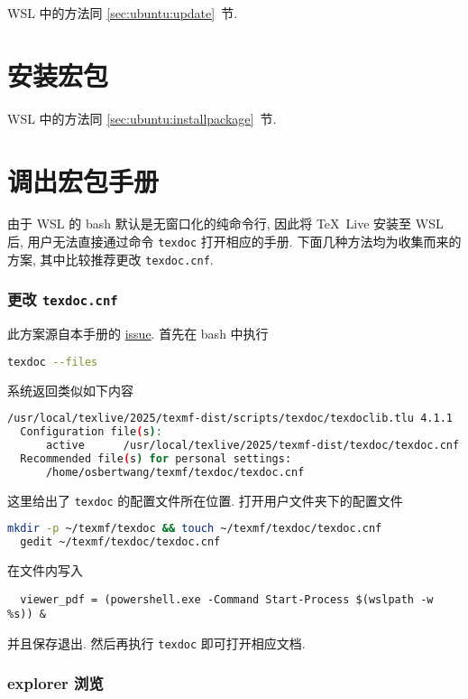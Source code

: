 WSL 中的方法同 \ref{sec:ubuntu:update}~节.

\section{安装宏包}

WSL 中的方法同 \ref{sec:ubuntu:installpackage}~节.

\section{调出宏包手册}

由于 WSL 的 \textsf{bash} 默认是无窗口化的纯命令行,
因此将 \TeX\ Live 安装至 WSL 后,
用户无法直接通过命令 \texttt{texdoc} 打开相应的手册.
下面几种方法均为收集而来的方案,
其中比较推荐更改 \texttt{texdoc.cnf}.

\subsubsection{更改 \texttt{texdoc.cnf}}

此方案源自本手册的 \href{https://github.com/OsbertWang/install-latex-guide-zh-cn/issues/13}{issue}.
首先在 \textsf{bash} 中执行
\begin{lstlisting}[language=bash]
  texdoc --files
\end{lstlisting}
系统返回类似如下内容
\begin{lstlisting}[language=bash]
  /usr/local/texlive/2025/texmf-dist/scripts/texdoc/texdoclib.tlu 4.1.1
  Configuration file(s):
      active      /usr/local/texlive/2025/texmf-dist/texdoc/texdoc.cnf
  Recommended file(s) for personal settings:
      /home/osbertwang/texmf/texdoc/texdoc.cnf
\end{lstlisting}
这里给出了 \texttt{texdoc} 的配置文件所在位置.
打开用户文件夹下的配置文件
\begin{lstlisting}[language=bash]
  mkdir -p ~/texmf/texdoc && touch ~/texmf/texdoc/texdoc.cnf
  gedit ~/texmf/texdoc/texdoc.cnf
\end{lstlisting}
在文件内写入
\begin{lstlisting}
  viewer_pdf = (powershell.exe -Command Start-Process $(wslpath -w %s)) &
\end{lstlisting}
并且保存退出.
然后再执行 \texttt{texdoc} 即可打开相应文档.

\subsubsection{explorer 浏览}

